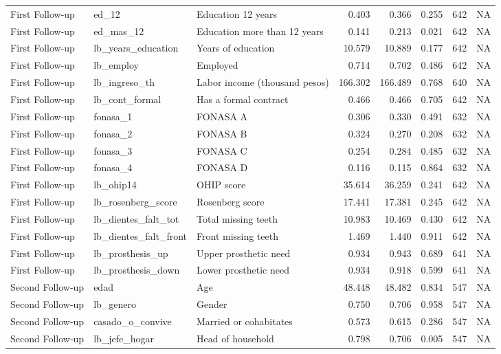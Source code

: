 \begin{table}
\begin{tabular}[t]{lllrrrrr}
First Follow-up & ed\_12 & Education 12 years & 0.403 & 0.366 & 0.255 & 642 & NA\\
First Follow-up & ed\_mas\_12 & Education more than 12 years & 0.141 & 0.213 & 0.021 & 642 & NA\\
\addlinespace
First Follow-up & lb\_years\_education & Years of education & 10.579 & 10.889 & 0.177 & 642 & NA\\
First Follow-up & lb\_employ & Employed & 0.714 & 0.702 & 0.486 & 642 & NA\\
First Follow-up & lb\_ingreso\_th & Labor income (thousand pesos) & 166.302 & 166.489 & 0.768 & 640 & NA\\
First Follow-up & lb\_cont\_formal & Has a formal contract & 0.466 & 0.466 & 0.705 & 642 & NA\\
First Follow-up & fonasa\_1 & FONASA A & 0.306 & 0.330 & 0.491 & 632 & NA\\
\addlinespace
First Follow-up & fonasa\_2 & FONASA B & 0.324 & 0.270 & 0.208 & 632 & NA\\
First Follow-up & fonasa\_3 & FONASA C & 0.254 & 0.284 & 0.485 & 632 & NA\\
First Follow-up & fonasa\_4 & FONASA D & 0.116 & 0.115 & 0.864 & 632 & NA\\
First Follow-up & lb\_ohip14 & OHIP score & 35.614 & 36.259 & 0.241 & 642 & NA\\
First Follow-up & lb\_rosenberg\_score & Rosenberg score & 17.441 & 17.381 & 0.245 & 642 & NA\\
\addlinespace
First Follow-up & lb\_dientes\_falt\_tot & Total missing teeth & 10.983 & 10.469 & 0.430 & 642 & NA\\
First Follow-up & lb\_dientes\_falt\_front & Front missing teeth & 1.469 & 1.440 & 0.911 & 642 & NA\\
First Follow-up & lb\_prosthesis\_up & Upper prosthetic need & 0.934 & 0.943 & 0.689 & 641 & NA\\
First Follow-up & lb\_prosthesis\_down & Lower prosthetic need & 0.934 & 0.918 & 0.599 & 641 & NA\\
Second Follow-up & edad & Age & 48.448 & 48.482 & 0.834 & 547 & NA\\
\addlinespace
Second Follow-up & lb\_genero & Gender & 0.750 & 0.706 & 0.958 & 547 & NA\\
Second Follow-up & casado\_o\_convive & Married or cohabitates & 0.573 & 0.615 & 0.286 & 547 & NA\\
Second Follow-up & lb\_jefe\_hogar & Head of household & 0.798 & 0.706 & 0.005 & 547 & NA\\

\end{tabular}
\end{table}

